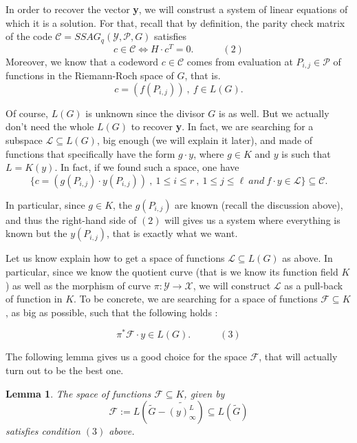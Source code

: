 \documentclass[10pt]{article}
\newtheorem{lem1}{Lemma}[]
\newcommand{\s}{\vspace{0.3cm}}
\newcommand{\cd}{\cdot}
\newcommand{\su}{\subseteq}
\newcommand{\X}{\mathcal{X}}
\newcommand{\Y}{\mathcal{Y}}
\newcommand{\PR}{\mathcal{P}}
\begin{document}
\s

In order to recover the vector \textbf{y}, we will construst a system of linear equations of which it is a solution. For that, recall that by definition, the parity check matrix of the code $\mathcal{C}=SSAG_q(\Y,\PR,G)$ satisfies
\[c \in \mathcal{C} \iff H \cd c^T = 0. \quad \quad \quad (2)\]
Moreover, we know that a codeword $c \in \mathcal{C}$ comes from evaluation at $P_{i,j} \in \PR$ of functions in the Riemann-Roch space of $G$, that is.
\[c = (f(P_{i,j})) \ , \ f \in L(G).\]

Of course, $L(G)$ is unknown since the divisor $G$ is as well. But we actually don't need the whole $L(G)$ to recover \textbf{y}. In fact, we are searching for a subspace $\mathcal{L} \su L(G)$, big enough (we will explain it later), and made of functions that specifically have the form $g \cd y$, where $g \in K$ and $y$ is such that $L=K(y)$. In fact, if we found such a space, one have 
\[\{c= (g(P_{i,j}) \cd y(P_{i,j})) \ , \ 1 \leq i \leq r \ , \ 1 \leq j \leq \ell \ and \ f\cd y \in \mathcal{L}\} \su \mathcal{C}.\] 

In particular, since $g \in K$, the $g(P_{i,j})$ are known (recall the discussion above), and thus the right-hand side of $(2)$ will gives us a system where everything is known but the $y(P_{i,j})$, that is exactly what we want.

\s

Let us know explain how to get a space of functions $\mathcal{L} \su L(G)$ as above. In particular, since we know the quotient curve (that is we know its function field $K$) as well as the morphism of curve $\pi : \Y \rightarrow \X$, we will construct $\mathcal{L}$ as a pull-back of function in $K$. To be concrete, we are searching for a space of functions $\mathcal{F} \su K$, as big as possible, such that the following holds :

\[\pi^*\mathcal{F} \cd y \in L(G). \quad \quad \quad (3)\]

The following lemma gives us a good choice for the space $\mathcal{F}$, that will actually turn out to be the best one.

\s

\begin{lem1}
The space of functions $\mathcal{F} \su K$, given by 
\[\mathcal{F} := L\left(\widetilde{G}-\widetilde{(y)^L_{\infty}}\right) \su L(\tilde{G})\]
satisfies condition $(3)$ above.
\end{lem1}

\s
\end{document}
